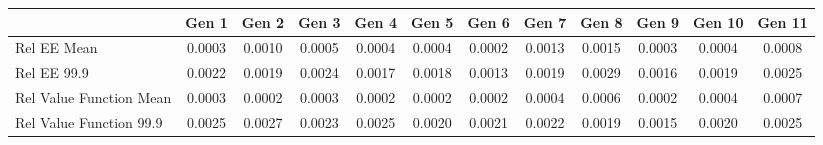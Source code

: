 
\begin{tabular}{@{}lccccccccccc@{}}
\hline
\hline
& Gen 1 & Gen 2 & Gen 3 & Gen 4 & Gen 5 & Gen 6 & Gen 7 & Gen 8 & Gen 9 & Gen 10 & Gen 11 \\
\hline
Rel EE Mean          & 0.0003 & 0.0010 & 0.0005 & 0.0004 & 0.0004 & 0.0002 & 0.0013 & 0.0015 & 0.0003 & 0.0004 & 0.0008 \\
Rel EE 99.9     & 0.0022 & 0.0019 & 0.0024 & 0.0017 & 0.0018 & 0.0013 & 0.0019 & 0.0029 & 0.0016 & 0.0019 & 0.0025 \\
Rel Value Function Mean       & 0.0003 & 0.0002 & 0.0003 & 0.0002 & 0.0002 & 0.0002 & 0.0004 & 0.0006 & 0.0002 & 0.0004 & 0.0007 \\
Rel Value Function 99.9  & 0.0025 & 0.0027 & 0.0023 & 0.0025 & 0.0020 & 0.0021 & 0.0022 & 0.0019 & 0.0015 & 0.0020 & 0.0025 \\
\bottomrule
\end{tabular}